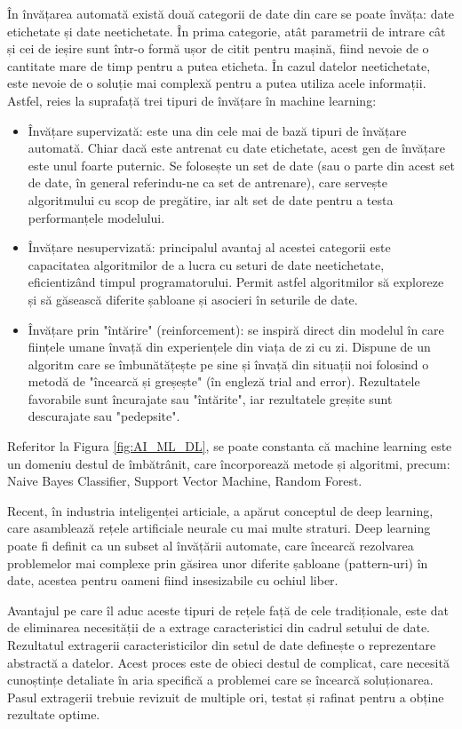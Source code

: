 \documentclass[a4paper, 12pt]{report}
\begin{document}
	În învățarea automată există două categorii de date din care se poate învăța: date etichetate și date neetichetate. În prima categorie, atât parametrii de intrare cât și cei de ieșire sunt într-o formă ușor de citit pentru mașină, fiind nevoie de o cantitate mare de timp pentru a putea eticheta. În cazul datelor neetichetate, este nevoie de o soluție mai complexă pentru a putea utiliza acele informații. Astfel, reies la suprafață trei tipuri de învățare în machine learning:
	\begin{itemize}
		\item Învățare supervizată: este una din cele mai de bază tipuri de învățare automată. Chiar dacă este antrenat cu date etichetate, acest gen de învățare este unul foarte puternic. Se folosește un set de date (sau o parte din acest set de date, în general referindu-ne ca set de antrenare), care servește algoritmului cu scop de pregătire, iar alt set de date pentru a testa performanțele modelului.
		\item Învățare nesupervizată: principalul avantaj al acestei categorii este capacitatea algoritmilor de a lucra cu seturi de date neetichetate, eficientizând timpul programatorului. Permit astfel algoritmilor să exploreze și să găsească diferite șabloane și asocieri în seturile de date.
		\item Învățare prin "întărire" (reinforcement): se inspiră direct din modelul în care ființele umane învață din experiențele din viața de zi cu zi. Dispune de un algoritm care se îmbunătățește pe sine și învață din situații noi folosind o metodă de "încearcă și greșește" (în engleză trial and error). Rezultatele favorabile sunt încurajate sau "întărite", iar rezultatele greșite sunt descurajate sau "pedepsite".
	\end{itemize}
	
	Referitor la Figura \ref{fig:AI_ML_DL}, se poate constanta că machine learning este un domeniu destul de îmbătrânit, care încorporează metode și algoritmi, precum: Naive Bayes Classifier, Support Vector Machine, Random Forest. 

	Recent, în industria inteligenței articiale, a apărut conceptul de deep learning, care asamblează rețele artificiale neurale cu mai multe straturi. Deep learning poate fi definit ca un subset al învățării automate, care încearcă rezolvarea problemelor mai complexe prin găsirea unor diferite șabloane (pattern-uri) în date, acestea pentru oameni fiind insesizabile cu ochiul liber.

	Avantajul pe care îl aduc aceste tipuri de rețele față de cele tradiționale, este dat de eliminarea necesității de a extrage caracteristici din cadrul setului de date. Rezultatul extragerii caracteristicilor din setul de date definește o reprezentare abstractă a datelor. Acest proces este de obieci destul de complicat, care necesită cunoștințe detaliate în aria specifică a problemei care se încearcă soluționarea. Pasul extragerii trebuie revizuit de multiple ori, testat și rafinat pentru a obține rezultate optime.
	
\end{document}
